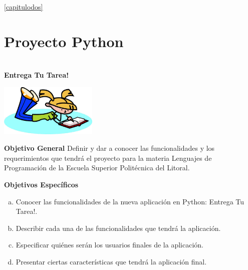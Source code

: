 \documentclass[12pt]{report}
\begin{document}
 \ref{capitulodos}




\chapter{Proyecto Python\label{capitulotres}}
\begin{center}
		\Huge{\textbf{\\Entrega Tu Tarea!	\vspace{1em}}}
\end{center}	


	\begin{center}
		\begingroup
			\includegraphics[width=0.35\textwidth]{imagenes_usuario/tarea.jpg}
		\endgroup
	\end{center}



	\begingroup
		\large{
			\textbf{
				Objetivo General
				\newline
				\newline
			}
		}
	\endgroup
	Definir y dar a conocer las funcionalidades y los requerimientos que tendrá el proyecto para la materia Lenguajes de 				
	Programación de la Escuela Superior Politécnica del Litoral. 

	\vspace{4em}
	\begingroup
		\large{
			\textbf{
				Objetivos Específicos
				\newline
			}
		}
	\endgroup
		\begin{enumerate}[(a)]%
		\item Conocer las funcionalidades de la nueva aplicación en Python: Entrega Tu Tarea!.
		\item Describir cada una de las funcionalidades que tendrá la aplicación.
		\item Especificar quiénes serán los usuarios finales de la aplicación.
		\item Presentar ciertas características que tendrá la aplicación final.

		\end{enumerate}
\end{document}
